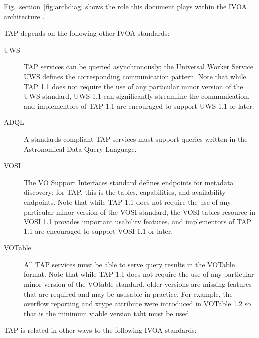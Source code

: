 \documentclass[11pt,letter]{ivoa}
\begin{document}
Fig.~section~\ref{fig:archdiag} shows the role this document plays within the
IVOA architecture \citep{note:VOARCH}.

TAP depends on the following other IVOA standards:

\begin{description}

\item[UWS \citep{2016ivoa.spec.1024H}] TAP services can be queried
asynchronously; the Universal Worker Service UWS defines the
corresponding communication pattern.  Note that while TAP 1.1 does not
require the use of any particular minor version of the UWS standard, 
UWS 1.1 can significantly streamline the communication, and
implementors of TAP 1.1 are encouraged to support UWS 1.1 or later.

\item[ADQL \citep{2008ivoa.spec.1030O}] A standards-compliant TAP
services must support queries written in the Astronomical Data Query
Language.

\item[VOSI \citep{std:VOSI11}] The VO Support Interfaces standard
defines endpoints for metadata discovery; for TAP, this is the tables,
capabilities, and availability endpoints. Note that while TAP 1.1 does not
require the use of any particular minor version of the VOSI standard, 
the VOSI-tables resource in VOSI 1.1 provides important usability features, and
implementors of TAP 1.1 are encouraged to support VOSI 1.1 or later.

\item[VOTable \citep{2013ivoa.spec.0920O}] All TAP services must be able
to serve query results in the VOTable format. Note that while TAP 1.1 does not
require the use of any particular minor version of the VOtable standard, older 
versions are missing features that are required and may be ususable in practice.
For example, the overflow reporting and xtype attribute were introduced in 
VOTable 1.2 so that is the minimum viable version taht must be used.
\end{description}


TAP is related in other ways to the following IVOA standards:
\end{document}
